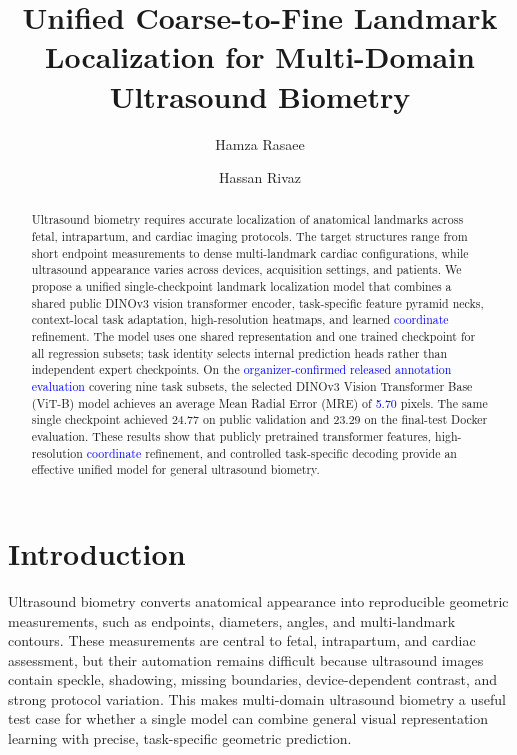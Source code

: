 \documentclass[runningheads]{llncs}
\title{Unified Coarse-to-Fine Landmark Localization for Multi-Domain Ultrasound Biometry}
\author{
Hamza Rasaee\inst{1}
\and
Hassan Rivaz\inst{1}
}
\institute{
Department of Electrical and Computer Engineering, Concordia University, Montreal, Canada\\
\email{\{hamza.rasaee,hassan.rivaz\}@concordia.ca}
}
\newcommand{\revisiontext}[1]{\textcolor{blue}{#1}}
\begin{document}
\maketitle

\begin{abstract}
\noindent Ultrasound biometry requires accurate localization of anatomical landmarks across fetal, intrapartum, and cardiac imaging protocols. The target structures range from short endpoint measurements to dense multi-landmark cardiac configurations, while ultrasound appearance varies across devices, acquisition settings, and patients. We propose a unified single-checkpoint landmark localization model that combines a shared public DINOv3 vision transformer encoder, task-specific feature pyramid necks, context-local task adaptation, high-resolution heatmaps, and learned \revisiontext{coordinate} refinement. The model uses one shared representation and one trained checkpoint for all regression subsets; task identity selects internal prediction heads rather than independent expert checkpoints. On the \revisiontext{organizer-confirmed released annotation evaluation} covering nine task subsets, the selected DINOv3 Vision Transformer Base (ViT-B) model achieves an average Mean Radial Error (MRE) of \revisiontext{5.70} pixels. The same single checkpoint achieved 24.77 on public validation and 23.29 on the final-test Docker evaluation. These results show that publicly pretrained transformer features, high-resolution \revisiontext{coordinate} refinement, and controlled task-specific decoding provide an effective unified model for general ultrasound biometry.

\end{abstract}

\section{Introduction}
Ultrasound biometry converts anatomical appearance into reproducible geometric measurements, such as endpoints, diameters, angles, and multi-landmark contours. These measurements are central to fetal, intrapartum, and cardiac assessment, but their automation remains difficult because ultrasound images contain speckle, shadowing, missing boundaries, device-dependent contrast, and strong protocol variation. This makes multi-domain ultrasound biometry a useful test case for whether a single model can combine general visual representation learning with precise, task-specific geometric prediction.
\end{document}
